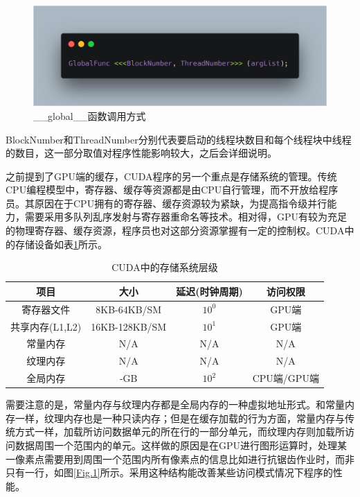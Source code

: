 \begin{figure}
	\centering
	\includegraphics[width=15cm]{figures/CODE3.png}
	\caption{\label{Fig.4} \_\_global\_\_函数调用方式}
\end{figure}
BlockNumber和ThreadNumber分别代表要启动的线程块数目和每个线程块中线程的数目，这一部分取值对程序性能影响较大，之后会详细说明。

\par 之前提到了GPU端的缓存，CUDA程序的另一个重点是存储系统的管理。传统CPU编程模型中，寄存器、缓存等资源都是由CPU自行管理，而不开放给程序员。其原因在于CPU拥有的寄存器、缓存资源较为紧缺，为提高指令级并行能力，需要采用多队列乱序发射与寄存器重命名等技术。相对得，GPU有较为充足的物理寄存器、缓存资源，程序员也对这部分资源掌握有一定的控制权\parencite{CUDAPROG}。CUDA中的存储设备如表\ref{table-存储}所示。
\begin{table}
	\centering
	\caption{CUDA中的存储系统层级}
	\begin{tabular}{cccc}
		\toprule
		项目				&	大小			&	延迟(时钟周期)	&	访问权限	\\
		\midrule
		寄存器文件		&	8KB-64KB/SM		&	$ 10^0 $	& GPU端	\\
		共享内存(L1,L2)	&	16KB-128KB/SM	&	$ 10^1 $	&	GPU端\\
		常量内存		&	N/A				&	N/A		&	N/A	\\
		纹理内存		&	N/A				&	N/A		&	N/A \\
		全局内存		&	-GB				&	$ 10^2 $	&	CPU端/GPU端 \\
		\bottomrule
	\end{tabular} \label{table-存储}
\end{table}
\par 需要注意的是，常量内存与纹理内存都是全局内存的一种虚拟地址形式。和常量内存一样，纹理内存也是一种只读内存；但是在缓存加载的行为方面，常量内存与传统方式一样，加载所访问数据单元的所在行的一部分单元，而纹理内存则加载所访问数据周围一个范围内的单元\parencite{THEDESIGN}。这样做的原因是在GPU进行图形运算时，处理某一像素点需要用到周围一个范围内所有像素点的信息比如进行抗锯齿作业时，而非只有一行，如图\ref{Fig.1}所示。采用这种结构能改善某些访问模式情况下程序的性能。
